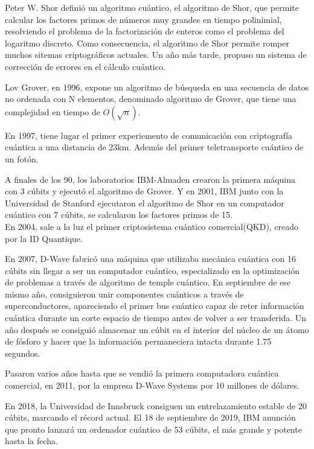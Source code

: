Peter W. Shor definió un algoritmo cuántico, el algoritmo de Shor, que permite calcular los factores primos de números muy grandes en tiempo polinimial, resolviendo el problema de la factorización de enteros como el problema del logaritmo discreto. Como consecuencia, el algoritmo de Shor permite romper muchos sitemas criptográficos actuales. Un año más tarde, propuso un sistema de corrección de errores en el cálculo cuántico.

Lov Grover, en 1996, expone un algoritmo de búsqueda en una secuencia de datos no ordenada con N elementos, denominado algoritmo de Grover, que tiene una complejidad en tiempo de $O(\sqrt{n})$.

En 1997, tiene lugar el primer experiemento de comunicación con criptografía cuántica a una distancia de 23km. Además del primer teletransporte cuántico de un fotón.

A finales de los 90, los laboratorios IBM-Almaden crearon la primera máquina con 3 cúbits y ejecutó el algoritmo de Grover. Y en 2001, IBM junto con la Universidad de Stanford ejecutaron el algoritmo de Shor en un computador cuántico con 7 cúbits, se calcularon los factores primos de 15.\\

En 2004, sale a la luz el primer criptosistema cuántico comercial(QKD), creado por la ID Quantique.

En 2007, D-Wave fabricó una máquina que utilizaba mecánica cuántica con 16 cúbits sin llegar a ser un computador cuántico, especializado en la optimización de problemas a través de algoritmo de temple cuántico. En septiembre de ese mismo año, consiguieron unir componentes cuánticos a través de superconductores, apareciendo el primer bus cuántico capaz de reter información cuántica durante un corte espacio de tiempo antes de volver a ser transferida. Un año después se consiguió almacenar un cúbit en el interior del núcleo de un átomo de fósforo y hacer que la información permaneciera intacta durante 1.75 segundos.

Pasaron varios años hasta que se vendió la primera computadora cuántica comercial, en 2011, por la empresa D-Wave Systems por 10 millones de dólares.

En 2018, la Universidad de Innsbruck consiguen un entrelazamiento estable de 20 cúbits, marcando el récord actual. El 18 de septiembre de 2019, IBM anunción que pronto lanzará un ordenador cuántico de 53 cúbits, el más grande y potente hasta la fecha.\\

